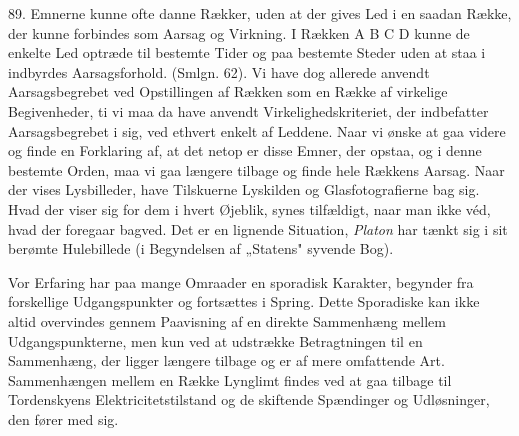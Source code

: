 \documentclass[12pt,a4paper]{book}
\begin{document}
89. Emnerne kunne ofte danne Rækker, uden at der gives Led i en saadan Række, der
kunne forbindes som Aarsag og Virkning. I Rækken A B C D kunne de enkelte Led
optræde til bestemte Tider og paa bestemte Steder uden at staa i indbyrdes
Aarsagsforhold. (Smlgn. 62). Vi have dog allerede anvendt Aarsagsbegrebet ved
Opstillingen af Rækken som en Række af virkelige Begivenheder, ti vi maa da have
anvendt Virkelighedskriteriet, der indbefatter Aarsagsbegrebet i sig, ved
ethvert enkelt af Leddene. Naar vi ønske at gaa videre og finde en Forklaring af,
at det netop er disse Emner, der opstaa, og i denne bestemte Orden, maa vi gaa
længere tilbage og finde hele Rækkens Aarsag. Naar der vises Lysbilleder, have
Tilskuerne Lyskilden og Glasfotografierne bag sig. Hvad der viser sig for dem i
hvert Øjeblik, synes tilfældigt, naar man ikke véd, hvad der foregaar bagved. Det
er en lignende Situation, \emph{Platon} har tænkt sig i sit berømte Hulebillede
(i Begyndelsen af „Statens" syvende Bog).

Vor Erfaring har paa mange Omraader en sporadisk Karakter, begynder fra
forskellige Udgangspunkter og fortsættes i Spring. Dette Sporadiske kan ikke
altid overvindes gennem Paavisning af en direkte Sammenhæng mellem
Udgangspunkterne, men kun ved at udstrække Betragtningen til en Sammenhæng, der
ligger længere tilbage og er af mere omfattende Art. Sammenhængen mellem en Række
Lynglimt findes ved at gaa tilbage til Tordenskyens Elektricitetstilstand og de
skiftende Spændinger og Udløsninger, den fører med sig.
\end{document}
